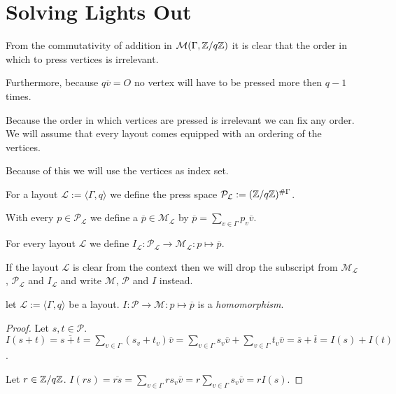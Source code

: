 \section{Solving Lights Out}

\begin{remark}
	From the commutativity of addition in $\mathcal{M}(\Gamma,\mathbb{Z}/q\mathbb{Z})$ it is
	clear that the order in which to press vertices is irrelevant.
	
	Furthermore, because $q\overline{v}=O$ no vertex will have to be pressed
	more then $q-1$ times.
\end{remark}

\begin{remark}
	Because the order in which vertices are pressed is irrelevant we can
	fix any order. We will assume that every layout comes equipped with an
	ordering of the vertices.
	
	Because of this we will use the vertices as index set.
\end{remark}

\begin{definition}
	For a layout $\mathcal{L}:=\langle\Gamma,q\rangle$ we define the press
	space $\mathcal{P}_{\mathcal{L}}:=(\mathbb{Z}/q\mathbb{Z})^{\#\Gamma}$.
	
	With every $p\in\mathcal{P}_{\mathcal{L}}$ we define a
	$\overline{p}\in\mathcal{M}_{\mathcal{L}}$ by $\overline{p} =
	\sum_{v\in\Gamma} p_{v}\overline{v}$.
\end{definition}

\begin{definition}
	For every layout $\mathcal{L}$ we define $I_{\mathcal{L}} :
	\mathcal{P}_{\mathcal{L}} \rightarrow \mathcal{M}_{\mathcal{L}} :
	p\mapsto\overline{p}$.
\end{definition}

\begin{remark}
	If the layout $\mathcal{L}$ is clear from the context then we will drop
	the subscript from $\mathcal{M}_{\mathcal{L}}$,
	$\mathcal{P}_\mathcal{L}$ and $I_{\mathcal{L}}$ and write $\mathcal{M}$,
	$\mathcal{P}$ and $I$ instead.
\end{remark}

\begin{lemma}
	let $\mathcal{L}:=\langle\Gamma,q\rangle$ be a layout. $I :
	\mathcal{P}\rightarrow\mathcal{M} : p\mapsto\overline{p}$ is a
	\emph{homomorphism}. 
\end{lemma}

\begin{proof}
	Let $s,t\in\mathcal{P}$. $I(s+t) = \overline{s+t} =
	\sum_{v\in\Gamma} (s_{v}+t_{v})\overline{v} =
	\sum_{v\in\Gamma} s_{v}\overline{v} +
	\sum_{v\in\Gamma} t_{v}\overline{v} = \overline{s} +
	\overline{t} = I(s) + I(t)$.
	
	Let $r\in \mathbb{Z}/q\mathbb{Z}$. $I(rs) = \overline{rs} = \sum_{v\in\Gamma}
	rs_{v}\overline{v} = r \sum_{v\in\Gamma} s_{v}\overline{v} = rI(s)$.
\end{proof}

